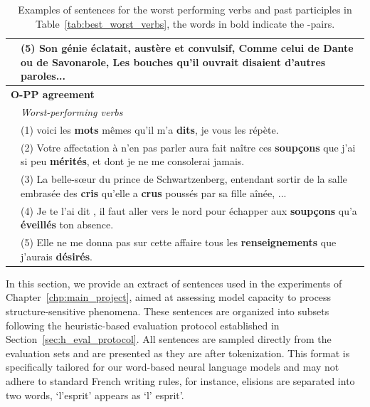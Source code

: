\begin{table}[ht]
{\begin{tabular}{l|p{15cm}}
   \phantom{a} & (5) Son génie éclatait, austère et convulsif, Comme celui de Dante ou de Savonarole, Les \textbf{bouches} qu'il ouvrait \textbf{disaient} d'autres paroles... \\
   \midrule
    \multicolumn{2}{l}{\textbf{O-PP agreement}} \\
    \phantom{a} & \textit{Worst-performing verbs} \\
    \midrule
  \phantom{a} & (1) voici les \textbf{mots} mêmes qu'il m'a \textbf{dits}, je vous les répète.\\
  \phantom{a} & (2) Votre affectation à n'en pas parler aura fait naître ces \textbf{soupçons} que j'ai si peu \textbf{mérités}, et dont je ne me consolerai jamais.\\
  \phantom{a} & (3) La belle-sœur du prince de Schwartzenberg, entendant sortir de la salle embrasée des \textbf{cris} qu'elle a \textbf{crus} poussés par sa fille aînée, ...\\
  \phantom{a} & (4) Je te l'ai dit , il faut aller vers le nord pour échapper aux \textbf{soupçons} qu'a \textbf{éveillés} ton absence. \\
  \phantom{a} & (5) Elle ne me donna pas sur cette affaire tous les \textbf{renseignements} que j'aurais \textbf{désirés}.\\
   \bottomrule
  \end{tabular} }
  \caption{Examples of sentences for the worst performing verbs and past participles in Table~\ref{tab:best_worst_verbs}, the words in bold indicate the \cue-\target pairs.}
   \label{tab:ex_worst_performing}
\end{table}




 \label{app:sample_sents}
In this section, we provide an extract of sentences used in the experiments of Chapter~\ref{chp:main_project}, aimed at assessing model capacity to process structure-sensitive phenomena. These sentences are organized into subsets following the heuristic-based evaluation protocol established in Section~\ref{sec:h_eval_protocol}. All sentences are sampled directly from the evaluation sets and are presented as they are after tokenization. This format is specifically tailored for our word-based neural language models and may not adhere to standard French writing rules, for instance, elisions are separated into two words, `l'esprit' appears as `l' esprit'.


